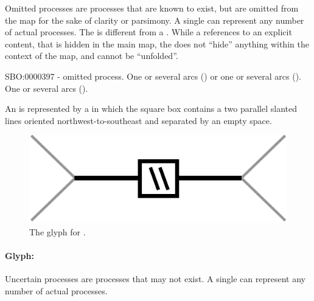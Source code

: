 Omitted processes are processes that are known to exist, but are omitted from the map for the sake of clarity or parsimony. A single  can represent any number of actual processes. The  is different from a . While a  references to an explicit content, that is hidden in the main map, the  does not ``hide'' anything within the context of the map, and cannot be ``unfolded''.

\begin{glyphDescription}
 \glyphSboTerm SBO:0000397 - omitted process.
 \glyphOrigin One or several  arcs () or one or several  arcs ().
 \glyphTarget One or several  arcs ().

 \glyphNode An  is represented by a  in which the square box contains a two parallel slanted lines oriented northwest-to-southeast and separated by an empty space.
 \end{glyphDescription}

\begin{figure}[H]
  \centering
  \includegraphics[scale = 0.5]{images/omitted}
  \caption{The \PD glyph for .}
  \label{fig:omitted}
\end{figure}



\paragraph{Glyph: }\label{sec:uncertain}

Uncertain processes are processes that may not exist. A single  can represent any number of actual processes.

